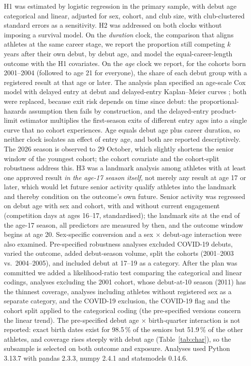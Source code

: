 \documentclass[12pt,a4paper]{article}
\begin{document}
H1 was estimated by logistic regression in the primary sample, with debut age categorical and linear, adjusted for sex, cohort, and club size, with club-clustered standard errors as a sensitivity. H2 was addressed on both clocks without imposing a survival model. On the \emph{duration} clock, the comparison that aligns athletes at the same career stage, we report the proportion still competing $k$ years after their own debut, by debut age, and model the equal-career-length outcome with the H1 covariates. On the \emph{age} clock we report, for the cohorts born 2001--2004 (followed to age 21 for everyone), the share of each debut group with a registered result at that age or later. The analysis plan specified an age-scale Cox model with delayed entry at debut and delayed-entry Kaplan--Meier curves \cite{korn1997}; both were replaced, because exit risk depends on time since debut: the proportional-hazards assumption then fails by construction, and the delayed-entry product-limit estimator multiplies the first-season exits of different entry ages into a single curve that no cohort experiences. Age equals debut age plus career duration, so neither clock isolates an effect of entry age, and both are reported descriptively. The 2026 season is observed to 29 October, which slightly shortens the senior window of the youngest cohort; the cohort covariate and the cohort-split robustness address this. H3 was a landmark analysis \cite{anderson1983} among athletes with at least one approved result \emph{in the age-17 season itself}, not merely any result at age 17 or later, which would let future senior activity qualify athletes into the landmark and thereby condition on the outcome's own future. Senior activity was regressed on debut age with sex and cohort, with and without current engagement (competition days at ages 16--17, standardised); the landmark sits at the end of the age-17 season, all predictors are measured by then, and the outcome window begins at age 20. Sex-specific conversion and a sex $\times$ debut-age interaction were also examined. Pre-specified robustness analyses excluded COVID-19 debuts, varied the outcome, added debut-season volume, split the cohorts (2001--2003 vs.\ 2004--2005), and included debut at 17--19 as a category. After the plan was committed we added a likelihood-ratio test comparing the categorical and linear codings, analyses excluding the 2001 cohort, whose debut-at-10 season (2011) has the thinnest coverage, analyses including athletes without registered sex as a separate category, and the COVID-19 exclusion, the COVID-19 flag and the cohort split applied to the categorical coding (the pre-specified versions concern the linear trend). The pre-specified debut age $\times$ birth-quarter interaction is not reported: exact birth dates exist for 98.5\,\% of the seniors but 51.9\,\% of the other athletes, and coverage rises steeply with debut age (Table~\ref{tab:char}), so the subsample is selected on both outcome and exposure. Analyses used Python 3.13.7 with pandas 2.3.3, numpy 2.4.1 and statsmodels 0.14.6.
\end{document}
